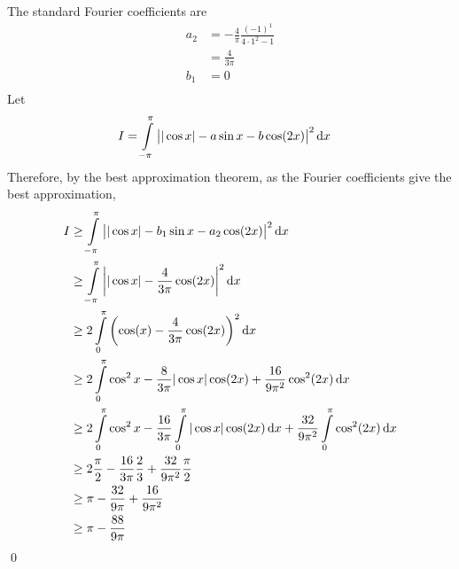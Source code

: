 \documentclass[fleqn, a4paper, 11pt, oneside]{amsart}
\theoremstyle{definition}
\theoremstyle{theorem}
\begin{document}
\begin{solution}
	The standard Fourier coefficients are
	\begin{align*}
		a_2 &= -\frac{4}{\pi} \frac{(-1)^1}{4 \cdot 1^2 - 1}\\
		&= \frac{4}{3 \pi}\\
		b_1 &= 0\\
	\end{align*}
	Let
	\begin{align*}
		I &= \int\limits_{-\pi}^{\pi} \left| |\cos x| - a \sin x - b \cos(2 x) \right|^2 \dif x
	\end{align*}
	Therefore, by the best approximation theorem, as the Fourier coefficients give the best approximation,
	\begin{align*}
		I &\ge \int\limits_{-\pi}^{\pi} \left| |\cos x| - b_1 \sin x - a_2 \cos(2 x) \right|^2 \dif x\\
		&\ge \int\limits_{-\pi}^{\pi} \left| |\cos x| - \frac{4}{3 \pi} \cos(2 x) \right|^2 \dif x\\
		&\ge 2 \int\limits_{0}^{\pi} \left( \cos(x) - \frac{4}{3 \pi} \cos(2 x) \right)^2 \dif x\\
		&\ge 2 \int\limits_{0}^{\pi} \cos^2 x - \frac{8}{3 \pi} |\cos x| \cos(2 x) + \frac{16}{9 \pi^2} \cos^2(2 x) \dif x\\
		&\ge 2 \int\limits_{0}^{\pi} \cos^2 x - \frac{16}{3 \pi} \int\limits_{0}^{\pi} |\cos x| \cos(2 x) \dif x + \frac{32}{9 \pi^2} \int\limits_{0}^{\pi} \cos^2(2 x) \dif x\\
		&\ge 2 \frac{\pi}{2} - \frac{16}{3 \pi} \frac{2}{3} + \frac{32}{9 \pi^2} \frac{\pi}{2}\\
		&\ge \pi - \frac{32}{9 \pi} + \frac{16}{9 \pi^2}\\
		&\ge \pi - \frac{88}{9 \pi}
	\end{align*}
	\qed
\end{solution}
\end{document}

